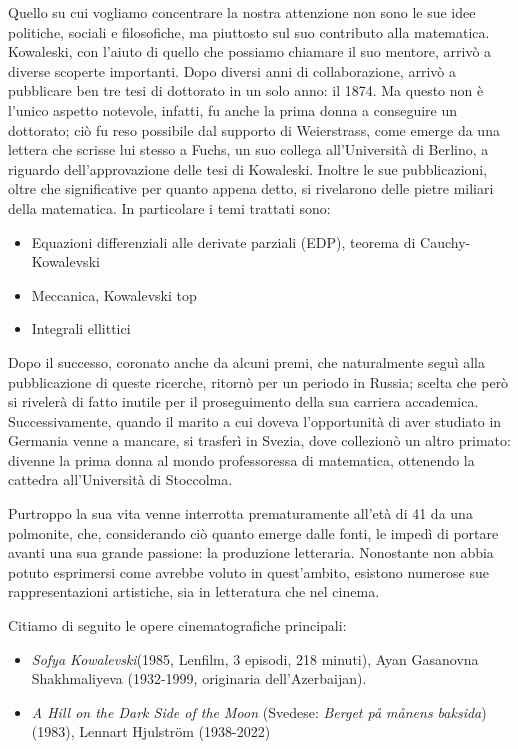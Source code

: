 Quello su cui vogliamo concentrare la nostra attenzione non sono le sue idee politiche, sociali e filosofiche, ma piuttosto sul suo contributo alla matematica. Kowaleski, con l'aiuto di quello che possiamo chiamare il suo mentore, arrivò a diverse scoperte importanti. Dopo diversi anni di collaborazione, arrivò a pubblicare ben tre tesi di dottorato in un solo anno: il 1874. Ma questo non è l'unico aspetto notevole, infatti, fu anche la prima donna a conseguire un dottorato; ciò fu reso possibile dal supporto di Weierstrass, come emerge da una lettera che scrisse lui stesso a Fuchs, un suo collega all'Università di Berlino, a riguardo dell'approvazione delle tesi di Kowaleski. Inoltre le sue pubblicazioni, oltre che significative per quanto appena detto, si rivelarono delle pietre miliari della matematica. In particolare i temi trattati sono:
\begin{itemize}
\item Equazioni differenziali alle derivate parziali (EDP), teorema di Cauchy-Kowalevski
\item Meccanica, Kowalevski top
\item Integrali ellittici
\end{itemize}


Dopo il successo, coronato anche da alcuni premi, che naturalmente seguì alla pubblicazione di queste ricerche, ritornò per un periodo in Russia; scelta che però si rivelerà di fatto inutile per il proseguimento della sua carriera accademica. Successivamente, quando il marito a cui doveva l'opportunità di aver studiato in Germania venne a mancare, si trasferì in Svezia, dove collezionò un altro primato: divenne la prima donna al mondo professoressa di matematica, ottenendo la cattedra all'Università di Stoccolma.

Purtroppo la sua vita venne interrotta prematuramente all'età di 41 da una polmonite, che, considerando ciò quanto emerge dalle fonti, le impedì di portare avanti una sua grande passione: la produzione letteraria.
Nonostante non abbia potuto esprimersi come avrebbe voluto in quest'ambito, esistono numerose sue rappresentazioni artistiche, sia in letteratura che nel cinema.

Citiamo di seguito le opere cinematografiche principali:
\begin{itemize}
\emergencystretch 3em
\item \textit{Sofya Kowalevski}(1985, Lenfilm, 3 episodi, 218 minuti), Ayan Gasanovna Shakhmaliyeva (1932-1999,
originaria dell'Azerbaijan).

\item \textit{A Hill on the Dark Side of the Moon} (Svedese: \textit{Berget på månens baksida})(1983), Lennart Hjulström (1938-2022)
\end{itemize}


